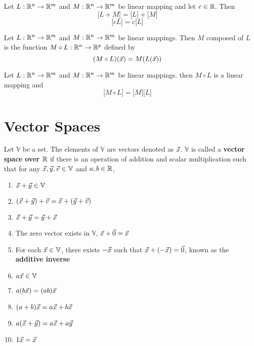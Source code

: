\documentclass[english, 12pt]{article}
\begin{document}
\begin{thrm}
Let $L: {\mathbb{R}}^n \rightarrow {\mathbb{R}}^m$ and $M: {\mathbb{R}}^n \rightarrow {\mathbb{R}}^m$ be linear mapping and let $c \in {\mathbb{R}}$. Then
\[\lbrack L + M \rbrack = \lbrack L \rbrack + \lbrack M \rbrack\]
\[\lbrack cL \rbrack = c \lbrack L \rbrack\]
\end{thrm}

\begin{defn}
Let $L:{\mathbb{R}}^n \rightarrow {\mathbb{R}}^m$ and $M:{\mathbb{R}}^n \rightarrow {\mathbb{R}}^m$ be linear mappings. Then $M$ composed of $L$ is the function $M \circ L: {\mathbb{R}}^n \rightarrow {\mathbb{R}}^p$ defined by
\[(M \circ L)(\vec{x}) = M(L(\vec{x}))\]
\end{defn}

\begin{thrm}
Let $L: {\mathbb{R}}^n \rightarrow {\mathbb{R}}^m$ and $M: {\mathbb{R}}^n \rightarrow {\mathbb{R}}^m$ be linear mappings. then $M \circ L$ is a linear mapping and
\[\lbrack M \circ L \rbrack = \lbrack M \rbrack \lbrack L \rbrack\]
\end{thrm}

\section{Vector Spaces}

\begin{defn}
Let $\mathbb{V}$ be a set. The elements of $\mathbb{V}$ are vectors denoted as $\vec{x}$. $\mathbb{V}$ is called a \textbf{vector space over ${\mathbb{R}}$} if there is an operation of addition and scalar multiplication such that for any $\vec{x},\vec{y},\vec{v} \in \mathbb{V}$ and $a,b \in {\mathbb{R}}$,
\begin{enumerate}
\item $\vec{x} + \vec{y} \in \mathbb{V}$
\item $(\vec{x} + \vec{y}) + \vec{v} = \vec{x} + (\vec{y} + \vec{v})$
\item $\vec{x} + \vec{y} = \vec{y} + \vec{x}$
\item The zero vector exists in $\mathbb{V}$, $\vec{x} + \vec{0} = \vec{x}$
\item For each $\vec{x} \in \mathbb{V}$, there exists $-\vec{x}$ such that $\vec{x} + (- \vec{x}) = \vec{0}$, known as the \textbf{additive inverse}
\item $a\vec{x} \in \mathbb{V}$
\item $a (b\vec{x}) = (ab)\vec{x}$
\item $(a+b)\vec{x} = a\vec{x} + b\vec{x}$
\item $a(\vec{x} + \vec{y}) = a\vec{x} + a\vec{y}$
\item $1\vec{x} = \vec{x}$
\end{enumerate}
\end{defn}
\end{document}
